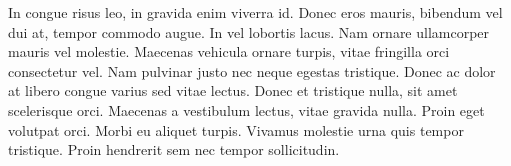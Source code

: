\documentclass{article}
\begin{document}
\begin{warn}[Notice:]
  In congue risus leo, in gravida enim viverra id. Donec eros mauris, bibendum vel dui at, tempor commodo augue. In vel lobortis lacus. Nam ornare ullamcorper mauris vel molestie. Maecenas vehicula ornare turpis, vitae fringilla orci consectetur vel. Nam pulvinar justo nec neque egestas tristique. Donec ac dolor at libero congue varius sed vitae lectus. Donec et tristique nulla, sit amet scelerisque orci. Maecenas a vestibulum lectus, vitae gravida nulla. Proin eget volutpat orci. Morbi eu aliquet turpis. Vivamus molestie urna quis tempor tristique. Proin hendrerit sem nec tempor sollicitudin.
\end{warn}

\end{document}
